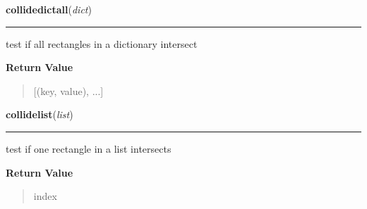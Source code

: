 \hspace{.8\funcindent}\begin{boxedminipage}{\funcwidth}

    \raggedright \textbf{collidedictall}(\textit{dict})

    \vspace{-1.5ex}

    \rule{\textwidth}{0.5\fboxrule}
\setlength{\parskip}{2ex}
    test if all rectangles in a dictionary intersect

\setlength{\parskip}{1ex}
      \textbf{Return Value}
    \vspace{-1ex}

      \begin{quote}
      [(key, value), ...]

      \end{quote}

    \end{boxedminipage}

    \label{pygame:Rect:collidelist}

    \vspace{0.5ex}

\hspace{.8\funcindent}\begin{boxedminipage}{\funcwidth}

    \raggedright \textbf{collidelist}(\textit{list})

    \vspace{-1.5ex}

    \rule{\textwidth}{0.5\fboxrule}
\setlength{\parskip}{2ex}
    test if one rectangle in a list intersects

\setlength{\parskip}{1ex}
      \textbf{Return Value}
    \vspace{-1ex}

      \begin{quote}
      index

      \end{quote}

    \end{boxedminipage}

    \label{pygame:Rect:collidelistall}

    \vspace{0.5ex}

